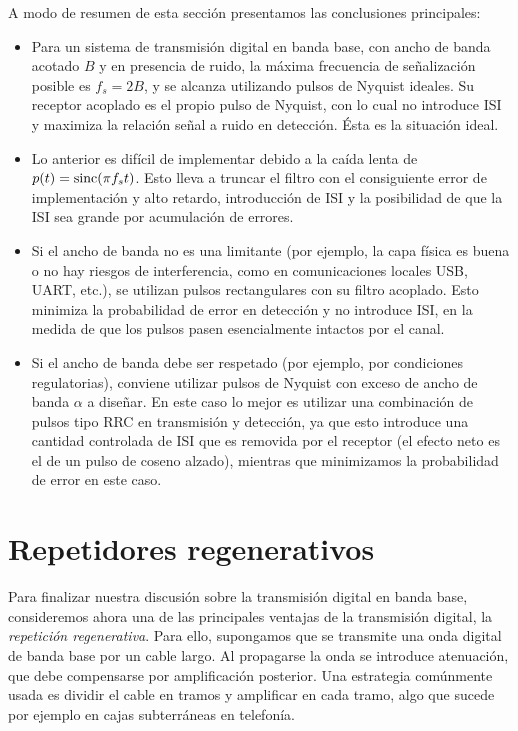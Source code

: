 A modo de resumen de esta sección presentamos las conclusiones principales:
\begin{itemize}
    \item Para un sistema de transmisión digital en banda base, con ancho de banda acotado $B$ y en presencia de ruido, la máxima frecuencia de señalización posible es $f_s=2B$, y se alcanza utilizando pulsos de Nyquist ideales. Su receptor acoplado es el propio pulso de Nyquist, con lo cual no introduce ISI y maximiza la relación señal a ruido en detección. Ésta es la situación ideal.
    
    \item Lo anterior es difícil de implementar debido a la caída lenta de $p(t)=\operatorname{sinc}(\pi f_s t)$. Esto lleva a truncar el filtro con el consiguiente error de implementación y alto retardo, introducción de ISI y la posibilidad de que la ISI sea grande por acumulación de errores.
    
    \item Si el ancho de banda no es una limitante (por ejemplo, la capa física es buena o no hay riesgos de interferencia, como en comunicaciones locales USB, UART, etc.), se utilizan pulsos rectangulares con su filtro acoplado. Esto minimiza la probabilidad de error en detección y no introduce ISI, en la medida de que los pulsos pasen esencialmente intactos por el canal.
    
    \item Si el ancho de banda debe ser respetado (por ejemplo, por condiciones regulatorias), conviene utilizar pulsos de Nyquist con exceso de ancho de banda $\alpha$ a diseñar. En este caso lo mejor es utilizar una combinación de pulsos tipo RRC en transmisión y detección, ya que esto introduce una cantidad controlada de ISI que es removida por el receptor (el efecto neto es el de un pulso de coseno alzado), mientras que minimizamos la probabilidad de error en este caso.
\end{itemize}

\section{Repetidores regenerativos}

Para finalizar nuestra discusión sobre la transmisión digital en banda base, consideremos ahora una de las principales ventajas de la transmisión digital, la \emph{repetición regenerativa}. Para ello, supongamos que se transmite una onda digital de banda base por un cable largo. Al propagarse la onda se introduce atenuación, que debe compensarse por amplificación posterior. Una estrategia comúnmente usada es dividir el cable en tramos y amplificar en cada tramo, algo que sucede por ejemplo en cajas subterráneas en telefonía.

